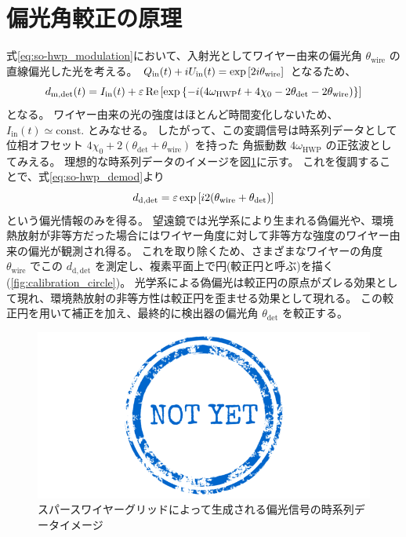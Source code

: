 \documentclass[../../main.tex]{subfiles}
\begin{document}
\section{偏光角較正の原理}
式\eqref{eq:so-hwp_modulation}において、入射光としてワイヤー由来の偏光角 $\theta_{\mathrm{wire}}$ の直線偏光した光を考える。
$Q_{\mathrm{in}}(t) + iU_{\mathrm{in}}(t) = \exp\qty[2i\theta_{\mathrm{wire}}]$ となるため、
\begin{equation}
    d_{\mathrm{m}, \mathrm{det}}(t) = I_{\mathrm{in}}(t) + \varepsilon\Re\qty[\exp\qty{-i \qty(4\omega_{\mathrm{HWP}}t + 4\chi_0 - 2\theta_{\mathrm{det}} - 2\theta_{\mathrm{wire}})}]
\end{equation}
となる。
ワイヤー由来の光の強度はほとんど時間変化しないため、$I_{\mathrm{in}}(t) \simeq \mathrm{const.}$ とみなせる。
したがって、この変調信号は時系列データとして位相オフセット $4\chi_0 + 2(\theta_{\mathrm{det}} + \theta_{\mathrm{wire}})$ を持った
角振動数 $4\omega_{\mathrm{HWP}}$ の正弦波としてみえる。
理想的な時系列データのイメージを図\ref{fig:wiregrid_mod}に示す。
これを復調することで、式\eqref{eq:so-hwp_demod}より
\begin{equation}
    d_{\mathrm{d, det}} = \varepsilon\exp\qty[i2\qty(\theta_{\mathrm{wire}} + \theta_{\mathrm{det}})]
    \label{eq:wiregrid_mod}
\end{equation}
という偏光情報のみを得る。
望遠鏡では光学系により生まれる偽偏光や、環境熱放射が非等方だった場合にはワイヤー角度に対して非等方な強度のワイヤー由来の偏光が観測され得る。
これを取り除くため、さまざまなワイヤーの角度 $\theta_{\mathrm{wire}}$ でこの $d_{\mathrm{d, det}}$ を測定し、複素平面上で円(較正円と呼ぶ)を描く(\ref{fig:calibration_circle})。
光学系による偽偏光は較正円の原点がズレる効果として現れ、環境熱放射の非等方性は較正円を歪ませる効果として現れる。
この較正円を用いて補正を加え、最終的に検出器の偏光角 $\theta_{\mathrm{det}}$ を較正する。
\begin{figure}[H]
    \centering
    \includegraphics[width=0.8\columnwidth]{draft/not-yet.png}
    \caption[スパースワイヤーグリッドによって生成される偏光信号の時系列データイメージ]{スパースワイヤーグリッドによって生成される偏光信号の時系列データイメージ}
    \label{fig:wiregrid_mod}
\end{figure}
\end{document}
